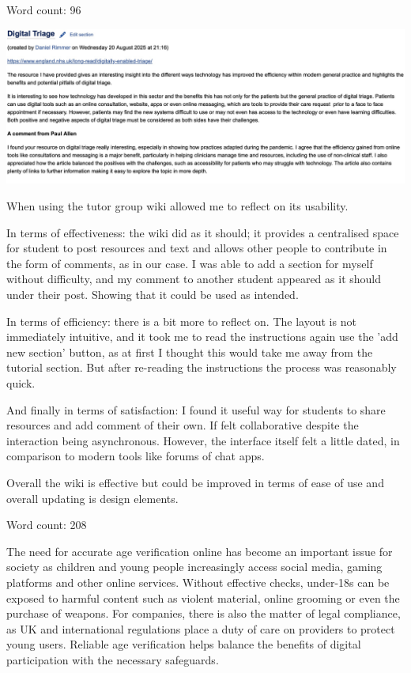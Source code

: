 \documentclass{tufte-handout}
\begin{document}
\begin{question}
Word count: 96

\includegraphics[scale=0.4]{Wiki_comment.jpg}

\qsubpart

When using the tutor group wiki allowed me to reflect on its usability.

In terms of effectiveness: the wiki did as it should; it provides a centralised space for 
student to post resources and text and allows other people to contribute in the form of comments, 
as in our case. I was able to add a section for myself without difficulty, and my comment to another 
student appeared as it should under their post. Showing that it could be used as intended. 

In terms of efficiency: there is a bit more to reflect on. The layout is not immediately intuitive, 
and it took me to read the instructions again use the 'add new section' button, as at first I 
thought this would take me away from the tutorial section. But after re-reading the instructions 
the process was reasonably quick. 

And finally in terms of satisfaction: I found it useful way for students to share resources and 
add comment of their own. If felt collaborative despite the interaction being asynchronous. 
However, the interface itself felt a little dated, in comparison to modern tools like forums of 
chat apps. 

Overall the wiki is effective but could be improved in terms of ease of use and overall 
updating is design elements.

Word count: 208

\vspace{3cm}

\qpart
\qsubpart

The need for accurate age verification online has become an important issue for society as children 
and young people increasingly access social media, gaming platforms and other online services. 
Without effective checks, under-18s can be exposed to harmful content such as violent material, 
online grooming or even the purchase of weapons. For companies, there is also the matter of legal 
compliance, as UK and international regulations place a duty of care on providers to protect young 
users. Reliable age verification helps balance the benefits of digital participation with the 
necessary safeguards.


\end{question}
\end{document}
